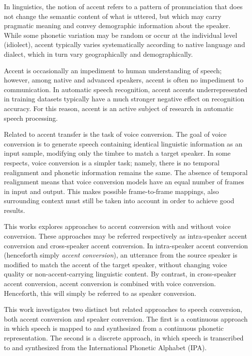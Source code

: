 In linguistics, the notion of accent refers to a pattern of pronunciation that does not change 
the semantic content of what is uttered, but which may carry pragmatic meaning and 
convey demographic information about the speaker. While some phonetic variation may be random 
or occur at the individual level (idiolect), accent typically varies systematically according 
to native language and dialect, which in turn vary geographically and demographically.

Accent is occasionally an impediment to human understanding of speech; however, among native 
and advanced speakers, accent is often no impediment to communication.
In automatic speech recognition, accent accents underrepresented in training datasets 
typically have a much stronger negative effect on recognition accuracy. For this reason, 
accent is an active subject of research in automatic speech processing.

Related to accent transfer is the task of voice conversion. The goal of voice conversion is to 
generate speech containing identical linguistic information as an input sample, modifying only the 
timbre to match a target speaker. In some respects, voice conversion is a simpler task; namely, 
there is no temporal realignment and phonetic information remains the same. 
The absence of temporal realignment means that voice conversion models have an equal number of frames 
in input and output. This makes possible frame-to-frame mappings, also surrounding context must still 
be taken into account in order to achieve good results.

This works explores approaches to accent conversion with and without voice conversion. 
These approaches may be referred respectively as intra-speaker accent conversion and cross-speaker 
accent conversion.
In intra-speaker accent conversion (henceforth simply \textit{accent conversion}), an utterance from the source speaker is modified to match the accent 
of the target speaker, without changing voice quality or non-accent-carrying linguistic content. 
By contrast, in cross-speaker accent conversion, accent conversion is combined with voice conversion. Henceforth, this will 
simply be referred to as speaker conversion.

This work investigates two distinct but related approaches to speech conversion, both accent conversion and 
speaker conversion. The first is a continuous approach in which speech is mapped to and synthesized from a
continuous phonetic representation. The second is a discrete approach, in which speech is transcribed to and 
synthesized from the International Phonetic Alphabet (IPA).

